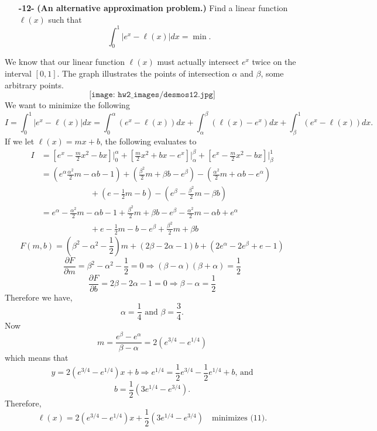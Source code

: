 \documentclass[11pt]{article}
\theoremstyle{definition}
\newcommand{\1}[1]{\mathbf{1} \left \{ #1 \right \}}
\begin{document}
\begin{itemize}
    \item[{\textbf{-12-}}] \textbf{(An alternative approximation problem.)}  Find a linear function $\ell(x)$ such that
    \begin{equation}
        \int_0^1 |e^x - \ell(x)| dx = \min.
    \end{equation}
\end{itemize}
We know that our linear function $\ell(x)$ must actually intersect $e^x$ twice on the interval $[0,1]$.  The graph illustrates the points of intersection $\alpha$ and $\beta$, some arbitrary points.
\[\texttt{[image: hw2\_images/desmos12.jpg]}\]
We want to minimize the following
\[I = \int_0^1 |e^x - \ell(x)| dx = \int_0^{\alpha} (e^x - \ell(x)) dx + \int_{\alpha}^{\beta} (\ell(x) - e^x) dx + \int_{\beta}^1 (e^x - \ell(x)) dx.\]
If we let $\ell(x) = mx+b$, the following evaluates to
\begin{equation*}
    \begin{split}
        I &= \left[e^x - \frac{m}{2}x^2 - bx\right]\bigg|_0^{\alpha} + \left[\frac{m}{2}x^2 + bx - e^x\right]\bigg|_{\alpha}^{\beta} + \left[e^x - \frac{m}{2}x^2 - bx\right]\bigg|_{\beta}^1 \\
        &= \left(e^{\alpha} \frac{\alpha^2}{2}m - \alpha b - 1\right) + \left(\frac{\beta^2}{2}m + \beta b - e^{\beta}\right) - \left(\frac{\alpha^2}{2}m + \alpha b - e^{\alpha}\right) \\
        & \qquad \qquad \qquad + \left(e - \frac{1}{2}m - b\right) - \left(e^{\beta} - \frac{\beta^2}{2}m - \beta b\right) \\
        &= e^{\alpha} - \frac{\alpha^2}{2}m - \alpha b - 1 + \frac{\beta^2}{2}m + \beta b - e^{\beta} - \frac{\alpha^2}{2}m - \alpha b + e^{\alpha} \\
        & \qquad \qquad \qquad + e - \frac{1}{2}m - b - e^{\beta} + \frac{\beta^2}{2}m + \beta b
    \end{split}
\end{equation*}
\[F(m,b) = \left(\beta^2 - \alpha^2 - \frac{1}{2}\right)m + \left(2\beta - 2\alpha - 1\right)b + \left(2e^{\alpha} - 2e^{\beta} + e - 1\right)\]
\[\frac{\partial F}{\partial m} = \beta^2 - \alpha^2 - \frac{1}{2} = 0 \Longrightarrow (\beta - \alpha)(\beta + \alpha) = \frac{1}{2}\]
\[\frac{\partial F}{\partial b} = 2\beta - 2\alpha - 1 = 0 \Longrightarrow \beta - \alpha = \frac{1}{2}\]
Therefore we have,
\[\alpha = \frac{1}{4} \text{  and  } \beta = \frac{3}{4}.\]
Now
\[m = \frac{e^{\beta} - e^{\alpha}}{\beta - \alpha} = 2\left(e^{3/4} - e^{1/4}\right)\]
which means that
\[y = 2\left(e^{3/4} - e^{1/4}\right)x + b \Longrightarrow e^{1/4} = \frac{1}{2}e^{3/4} - \frac{1}{2}e^{1/4} + b \text{, and}\]
\[b = \frac{1}{2}\left(3e^{1/4} - e^{3/4}\right).\]
Therefore,
\[\ell(x) = 2\left(e^{3/4} - e^{1/4}\right)x + \frac{1}{2}\left(3e^{1/4} - e^{3/4}\right) \quad \text{minimizes (11).}\]
\end{document}
